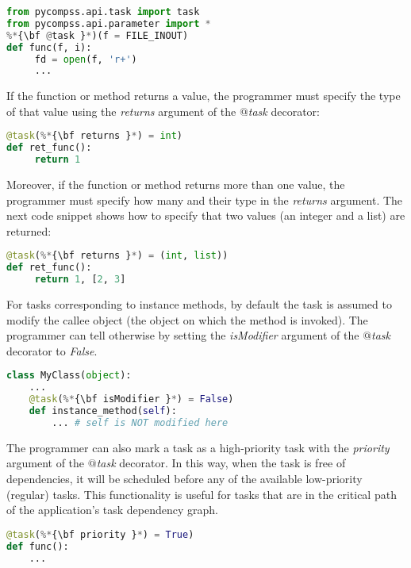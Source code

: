 \begin{lstlisting}[language=python]
from pycompss.api.task import task
from pycompss.api.parameter import *
%*{\bf @task }*)(f = FILE_INOUT)
def func(f, i):
     fd = open(f, 'r+')
     ...
\end{lstlisting}

If the function or method returns a value, the programmer must specify the type of that value using 
the {\it returns} argument of the {\it $@$task} decorator:

\begin{lstlisting}[language=python]
@task(%*{\bf returns }*) = int)
def ret_func():
     return 1
\end{lstlisting}

Moreover, if the function or method returns more than one value, the programmer must specify how many 
and their type in the {\it returns} argument. The next code snippet shows how to specify that two 
values (an integer and a list) are returned:

\begin{lstlisting}[language=python]
@task(%*{\bf returns }*) = (int, list))
def ret_func():
     return 1, [2, 3]
\end{lstlisting}

For tasks corresponding to instance methods, by default the task is assumed to modify the callee object 
(the object on which the method is invoked). The programmer can tell otherwise by setting the 
{\it isModifier} argument of the {\it $@$task} decorator to {\it False}.

\begin{lstlisting}[language=python]
class MyClass(object):
    ...
    @task(%*{\bf isModifier }*) = False)
    def instance_method(self):
        ... # self is NOT modified here
\end{lstlisting}

The programmer can also mark a task as a high-priority task with the {\it priority} argument of the 
{\it $@$task} decorator. In this way, when the task is free of dependencies, it will be scheduled before 
any of the available low-priority (regular) tasks. This functionality is useful for tasks that are in 
the critical path of the application’s task dependency graph.

\begin{lstlisting}[language=python]
@task(%*{\bf priority }*) = True)
def func():
    ...
\end{lstlisting}

